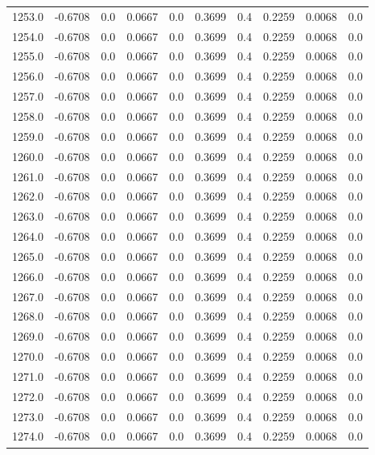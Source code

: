 \begin{longtable}{lrrrrrrrrr}
1253.0 & -0.6708 & 0.0 & 0.0667 & 0.0 & 0.3699 & 0.4 & 0.2259 & 0.0068 & 0.0 \\
1254.0 & -0.6708 & 0.0 & 0.0667 & 0.0 & 0.3699 & 0.4 & 0.2259 & 0.0068 & 0.0 \\
1255.0 & -0.6708 & 0.0 & 0.0667 & 0.0 & 0.3699 & 0.4 & 0.2259 & 0.0068 & 0.0 \\
1256.0 & -0.6708 & 0.0 & 0.0667 & 0.0 & 0.3699 & 0.4 & 0.2259 & 0.0068 & 0.0 \\
1257.0 & -0.6708 & 0.0 & 0.0667 & 0.0 & 0.3699 & 0.4 & 0.2259 & 0.0068 & 0.0 \\
1258.0 & -0.6708 & 0.0 & 0.0667 & 0.0 & 0.3699 & 0.4 & 0.2259 & 0.0068 & 0.0 \\
1259.0 & -0.6708 & 0.0 & 0.0667 & 0.0 & 0.3699 & 0.4 & 0.2259 & 0.0068 & 0.0 \\
1260.0 & -0.6708 & 0.0 & 0.0667 & 0.0 & 0.3699 & 0.4 & 0.2259 & 0.0068 & 0.0 \\
1261.0 & -0.6708 & 0.0 & 0.0667 & 0.0 & 0.3699 & 0.4 & 0.2259 & 0.0068 & 0.0 \\
1262.0 & -0.6708 & 0.0 & 0.0667 & 0.0 & 0.3699 & 0.4 & 0.2259 & 0.0068 & 0.0 \\
1263.0 & -0.6708 & 0.0 & 0.0667 & 0.0 & 0.3699 & 0.4 & 0.2259 & 0.0068 & 0.0 \\
1264.0 & -0.6708 & 0.0 & 0.0667 & 0.0 & 0.3699 & 0.4 & 0.2259 & 0.0068 & 0.0 \\
1265.0 & -0.6708 & 0.0 & 0.0667 & 0.0 & 0.3699 & 0.4 & 0.2259 & 0.0068 & 0.0 \\
1266.0 & -0.6708 & 0.0 & 0.0667 & 0.0 & 0.3699 & 0.4 & 0.2259 & 0.0068 & 0.0 \\
1267.0 & -0.6708 & 0.0 & 0.0667 & 0.0 & 0.3699 & 0.4 & 0.2259 & 0.0068 & 0.0 \\
1268.0 & -0.6708 & 0.0 & 0.0667 & 0.0 & 0.3699 & 0.4 & 0.2259 & 0.0068 & 0.0 \\
1269.0 & -0.6708 & 0.0 & 0.0667 & 0.0 & 0.3699 & 0.4 & 0.2259 & 0.0068 & 0.0 \\
1270.0 & -0.6708 & 0.0 & 0.0667 & 0.0 & 0.3699 & 0.4 & 0.2259 & 0.0068 & 0.0 \\
1271.0 & -0.6708 & 0.0 & 0.0667 & 0.0 & 0.3699 & 0.4 & 0.2259 & 0.0068 & 0.0 \\
1272.0 & -0.6708 & 0.0 & 0.0667 & 0.0 & 0.3699 & 0.4 & 0.2259 & 0.0068 & 0.0 \\
1273.0 & -0.6708 & 0.0 & 0.0667 & 0.0 & 0.3699 & 0.4 & 0.2259 & 0.0068 & 0.0 \\
1274.0 & -0.6708 & 0.0 & 0.0667 & 0.0 & 0.3699 & 0.4 & 0.2259 & 0.0068 & 0.0 \\

\end{longtable}
